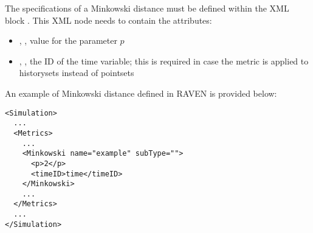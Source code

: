 The specifications of a Minkowski distance must be defined within the XML block
.
%
This XML node needs to contain the attributes:

\begin{itemize}
  \item {}, , value for the parameter $p$
  \item {}, , the ID of the time variable; this is required in case the metric is applied to historysets instead of pointsets
\end{itemize}

An example of Minkowski distance defined in RAVEN is provided below:
\begin{lstlisting}[style=XML]
<Simulation> 
  ...
  <Metrics>
    ...
    <Minkowski name="example" subType="">
      <p>2</p>
      <timeID>time</timeID>
    </Minkowski>
    ...
  </Metrics>
  ...
</Simulation>
\end{lstlisting}




